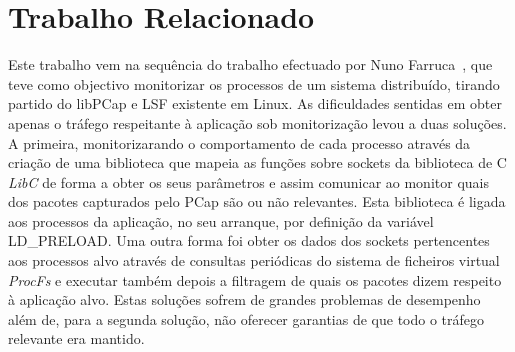 \documentclass[a4paper]{llncs}
\providecommand{\e}[1]{\ensuremath{\times 10^{#1}}}
\begin{document}
%
%
%

\section{Trabalho Relacionado}
\label{sec:related_work}


Este trabalho vem na sequência do trabalho efectuado por Nuno Farruca~\cite{Farruca:2009,duarte10}, que teve como objectivo monitorizar os processos de um sistema distribuído, tirando partido do libPCap e LSF existente em Linux. As dificuldades sentidas em obter apenas o tráfego respeitante à aplicação sob monitorização levou a duas soluções. A primeira, monitorizarando o comportamento de cada processo através da criação de uma biblioteca que mapeia as funções sobre sockets da biblioteca de C \textit{LibC} de forma a obter os seus parâmetros e assim comunicar ao monitor quais dos pacotes capturados pelo PCap são ou não relevantes. Esta biblioteca é ligada aos processos da aplicação, no seu arranque, por definição da variável LD\_PRELOAD.
 Uma outra forma foi obter os dados dos sockets pertencentes aos processos alvo através de consultas periódicas do sistema de ficheiros virtual \textit{ProcFs} e executar também depois a filtragem de quais os pacotes dizem respeito à aplicação alvo.  Estas soluções sofrem de grandes problemas de desempenho além de, para a segunda solução, não oferecer garantias de que todo o tráfego relevante era mantido.
\end{document}
